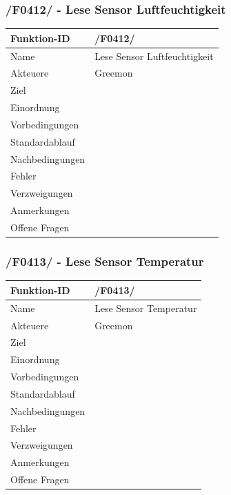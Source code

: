 \documentclass[pointlessnumbers]{scrartcl}
\begin{document}
 \subsubsection{/F0412/ - Lese Sensor Luftfeuchtigkeit}
 \begin{tabular}{|p{\BreiteErsterTab}|p{\BreiteZweiterTab}|}\hline
    Funktion-ID &       /F0412/  
                        \\ \hline
    Name &              Lese Sensor Luftfeuchtigkeit
                        \\ \hline
    Akteuere &          Greemon
                        \\ \hline
    Ziel &             
                        \\ \hline
    Einordnung &        
                        \\ \hline
    Vorbedingungen &    
                        \\ \hline
    Standardablauf &    
                        \\ \hline
    Nachbedingungen &   
                        \\ \hline
    Fehler &       
                        \\ \hline
    Verzweigungen &     
                        \\ \hline
    Anmerkungen &       
                        \\ \hline
    Offene Fragen &     
                        \\ \hline
 \end{tabular} 
 
 \subsubsection{/F0413/ - Lese Sensor Temperatur}
 \begin{tabular}{|p{\BreiteErsterTab}|p{\BreiteZweiterTab}|}\hline
    Funktion-ID &       /F0413/  
                        \\ \hline
    Name &              Lese Sensor Temperatur
                        \\ \hline
    Akteuere &          Greemon
                        \\ \hline
    Ziel &             
                        \\ \hline
    Einordnung &        
                        \\ \hline
    Vorbedingungen &    
                        \\ \hline
    Standardablauf &    
                        \\ \hline
    Nachbedingungen &   
                        \\ \hline
    Fehler &       
                        \\ \hline
    Verzweigungen &     
                        \\ \hline
    Anmerkungen &       
                        \\ \hline
    Offene Fragen &     
                        \\ \hline
 \end{tabular} 
 
\end{document}
